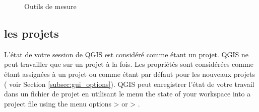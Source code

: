 \begin{figure}[h]
\caption{Outils de mesure \nixcaption} \label{fig:measure}
\centering
  \goodgap
\end{figure}

%
%
%

\subsection{les projets}\label{sec:projects}

L'état de votre session de QGIS est considéré comme étant un projet. QGIS ne peut travailler que sur un projet à la fois. Les propriétés sont considérées comme étant assignées à un projet ou comme étant par défaut pour les nouveaux projets ( voir Section \ref{subsec:gui_options}). QGIS peut enregistrer l'état de votre travail dans un fichier de projet en utilisant le menu the state of your 
workspace into a project file using the menu options 
 > 
or  > .

